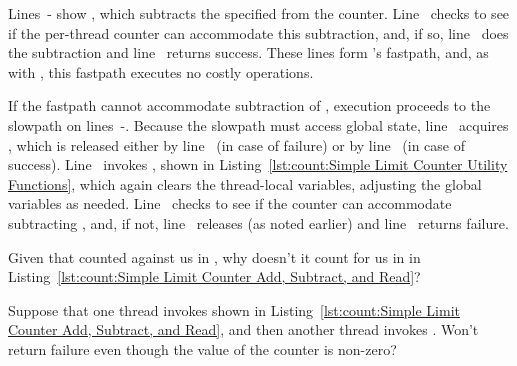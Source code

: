 \begin{lineref}
Lines~- show ,
which subtracts the specified
 from the counter.
Line~ checks to see if the per-thread counter can accommodate
this subtraction, and, if so, line~ does the subtraction and
line~ returns success.
These lines form 's fastpath, and, as with
, this fastpath executes no costly operations.

If the fastpath cannot accommodate subtraction of ,
execution proceeds to the slowpath on
lines~-.
Because the slowpath must access global state, line~
acquires , which is released either by line~
(in case of failure) or by line~ (in case of success).
Line~ invokes , shown in
Listing~\ref{lst:count:Simple Limit Counter Utility Functions},
which again clears the thread-local variables, adjusting the global variables
as needed.
Line~ checks to see if the counter can accommodate subtracting
, and, if not, line~ releases 
(as noted earlier) and line~ returns failure.
\end{lineref}

\QuickQuiz{}
	Given that  counted against us in ,
	why doesn't it count for us in  in
	Listing~\ref{lst:count:Simple Limit Counter Add, Subtract, and Read}?
 \QuickQuizEnd

\QuickQuiz{}
	Suppose that one thread invokes  shown in
	Listing~\ref{lst:count:Simple Limit Counter Add, Subtract, and Read},
	and then another thread invokes .
	Won't  return failure even though the value of
	the counter is non-zero?
 \QuickQuizEnd

